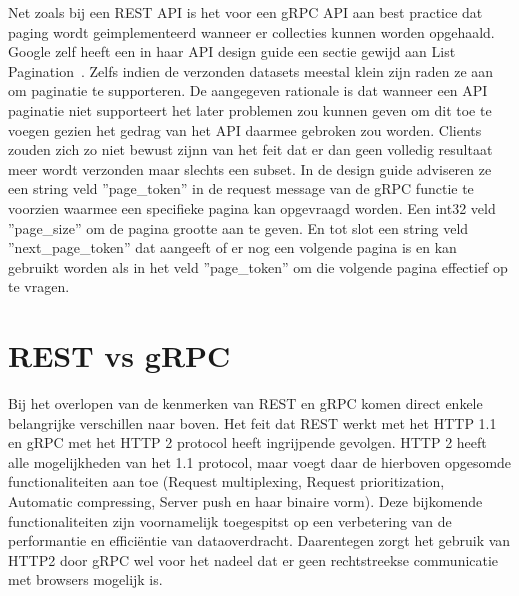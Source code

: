 Net zoals bij een REST API is het voor een gRPC API aan best practice dat paging wordt geimplementeerd wanneer er collecties kunnen worden opgehaald.
Google zelf heeft een in haar API design guide een sectie gewijd aan List Pagination~\parencite{googlepaging}. Zelfs indien de verzonden datasets meestal
klein zijn raden ze aan om paginatie te supporteren. De aangegeven rationale is dat wanneer een API paginatie niet supporteert het later
problemen zou kunnen geven om dit toe te voegen gezien het gedrag van het API daarmee gebroken zou worden. Clients zouden zich zo niet bewust zijnn van het feit
dat er dan geen volledig resultaat meer wordt verzonden maar slechts een subset. In de design guide adviseren ze een string veld ''page\_token'' in de request message
van de gRPC functie te voorzien waarmee een specifieke pagina kan opgevraagd worden. Een int32  veld ''page\_size'' om de pagina grootte aan te geven.
En tot slot een string veld  ''next\_page\_token'' dat aangeeft of er nog een volgende pagina is en kan gebruikt worden als in het veld ''page\_token''
om die volgende pagina effectief op te vragen.\newline
~\autocite{grpcversion}\\

\section{REST vs gRPC}

Bij het overlopen van de kenmerken van REST en gRPC komen direct enkele belangrijke verschillen naar boven.
Het feit dat REST werkt met het HTTP 1.1 en gRPC met het HTTP 2 protocol heeft ingrijpende gevolgen. HTTP 2 heeft alle mogelijkheden van het 1.1 protocol,
maar voegt daar de hierboven opgesomde functionaliteiten aan toe (Request multiplexing, Request prioritization, Automatic compressing,
Server push en haar binaire vorm). Deze bijkomende functionaliteiten zijn voornamelijk toegespitst op een verbetering van de performantie en efficiëntie van dataoverdracht.
Daarentegen zorgt het gebruik van HTTP2 door gRPC wel voor het nadeel dat er geen rechtstreekse communicatie met browsers mogelijk is.\newline
~\autocite{cloudflare}\\
~\autocite{tutsplus}\\

